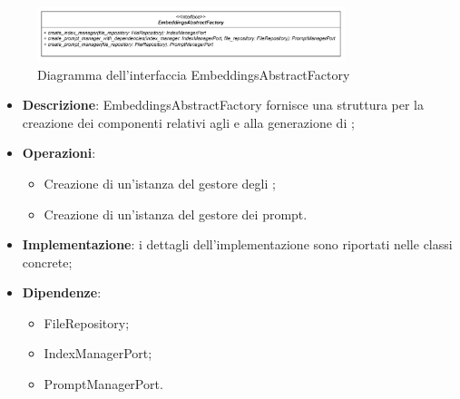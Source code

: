 
 \label{EmbeddingsAbstractFactory}
\begin{figure}[H]
    \centering
    \includegraphics[width=0.8\textwidth]{assets/Backend/embeddings_abstract_factory.png}
    \caption{Diagramma dell'interfaccia EmbeddingsAbstractFactory}
  \end{figure}
\begin{itemize}
    \item \textbf{Descrizione}: EmbeddingsAbstractFactory fornisce una struttura per la creazione dei componenti relativi agli  e alla generazione di ;
    \item \textbf{Operazioni}:
    \begin{itemize}
      \item Creazione di un'istanza del gestore degli ;
      \item Creazione di un'istanza del gestore dei prompt.
    \end{itemize}
    \item \textbf{Implementazione}: i dettagli dell'implementazione sono riportati nelle classi concrete;
    \item \textbf{Dipendenze}:
    \begin{itemize}
        \item FileRepository;
        \item IndexManagerPort;
        \item PromptManagerPort.
    \end{itemize}
\end{itemize}  

